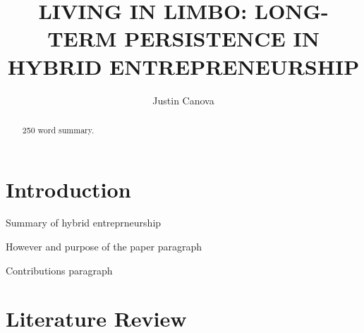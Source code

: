\documentclass{article}
\title{LIVING IN LIMBO: LONG-TERM PERSISTENCE IN HYBRID ENTREPRENEURSHIP}
\author{Justin Canova}
\begin{document}
\maketitle

\begin{abstract}
250 word summary.
\end{abstract}

\section{Introduction}

Summary of hybrid entreprneurship

However and purpose of the paper paragraph

Contributions paragraph

\section{Literature Review}
\end{document}
